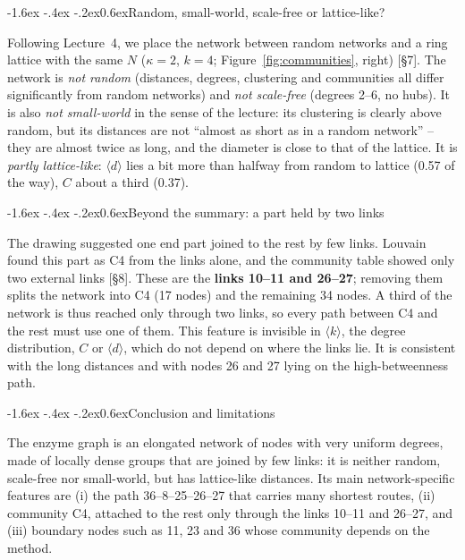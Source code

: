 \documentclass[10pt,a4paper]{article}
\makeatletter
\renewcommand\section{\@startsection{section}{1}{\z@}%
  {-1.6ex \@plus -.4ex \@minus -.2ex}{0.6ex}{\normalfont\large\bfseries}}
\makeatother
\begin{document}
\section{Random, small-world, scale-free or lattice-like?}

Following Lecture~4, we place the network between random networks and a ring lattice with the same
$N$ ($\kappa = 2$, $k = 4$; Figure~\ref{fig:communities}, right) [\S7].
The network is \emph{not random} (distances, degrees, clustering and communities all differ
significantly from random networks) and \emph{not scale-free} (degrees 2--6, no hubs). It is also
\emph{not small-world} in the sense of the lecture: its clustering is clearly above random, but its
distances are not ``almost as short as in a random network'' -- they are almost twice as long, and
the diameter is close to that of the lattice. It is \emph{partly lattice-like}: $\langle d\rangle$ lies
a bit more than halfway from random to lattice (0.57 of the way), $C$ about a third (0.37).

\section{Beyond the summary: a part held by two links}

The drawing suggested one end part joined to the rest by few links. Louvain found this part as C4
from the links alone, and the community table showed only two external links [\S8]. These are the
\textbf{links 10--11 and 26--27}; removing them splits the network into C4 (17 nodes) and the
remaining 34 nodes. A third of the network is thus reached only through two links, so every path
between C4 and the rest must use one of them. This feature is invisible in $\langle k\rangle$, the
degree distribution, $C$ or $\langle d\rangle$, which do not depend on where the links lie. It is
consistent with the long distances and with nodes 26 and 27 lying on the high-betweenness path.

\section{Conclusion and limitations}

The enzyme graph is an elongated network of nodes with very uniform degrees, made of locally dense
groups that are joined by few links: it is neither random, scale-free nor small-world, but has
lattice-like distances. Its main network-specific features are (i) the path 36--8--25--26--27 that
carries many shortest routes, (ii) community C4, attached to the rest only through the links 10--11
and 26--27, and (iii) boundary nodes such as 11, 23 and 36 whose community depends on the method.
\end{document}
